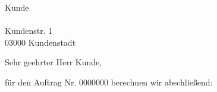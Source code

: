 \documentclass[backaddress=false,11pt,a4paper]{scrlttr2}
\begin{document}
\begin{letter}{Kunde\\
\ \\ 
Kundenstr. 1\\
03000  Kundenstadt}
\opening{Sehr geehrter Herr Kunde,}

für den Auftrag Nr. 0000000 berechnen wir abschließend:

\vspace{10pt}

\Euro{}
\Waehrung{\euro}

\begin{Rechnung}[N]

\end{Rechnung}

\end{letter}
\end{document}
